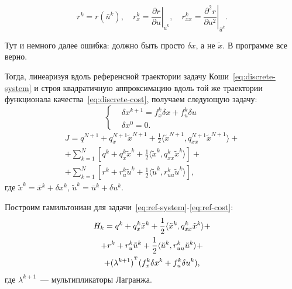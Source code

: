 $$
    r^k = r(\bar u^k),
    \quad
    r_x^k = \left.\frac{\partial r}{\partial u}\right|_{\bar u^k},
    \quad
    r_{xx}^k = \left.\frac{\partial^2 r}{\partial u^2}\right|_{\bar u^k}.
$$

{\color{red} Тут и немного далее ошибка: должно быть просто $\delta x$, а не $\tilde x$. В программе все верно.}

Тогда, линеаризуя вдоль референсной траектории задачу Коши~\eqref{eq:discrete-system} и строя квадратичную аппроксимацию вдоль той же траектории функционала качества~\eqref{eq:discrete-cost}, получаем следующую задачу:
\begin{equation}\label{eq:ref-system}
    \left\{\begin{aligned}
        &\delta x^{k+1} = f_x^k \delta x + f_u^k \delta u \\
        &\delta x^0 = 0.
    \end{aligned}\right.
\end{equation}
\begin{multline}\label{eq:ref-cost}
    J = q^{N+1} + q_x^{N+1}\tilde x^{N+1} + \frac{1}{2}\langle \tilde x^{N+1}, q_{xx}^{N+1}\tilde x^{N+1} \rangle
    + \\ +
    \sum_{k=1}^{N}\left[ q^{k} + q_x^{k}\tilde x^{k} + \frac{1}{2}\langle \tilde x^{k}, q_{xx}^{k}\tilde x^{k} \rangle \right]
    + \\ +
    \sum_{k=1}^{N}\left[ r^{k} + r_u^{k}\tilde u^{k} + \frac{1}{2}\langle \tilde u^{k}, r_{uu}^{k}\tilde u^{k} \rangle \right],
\end{multline}
где $\tilde x^k = \bar x^k + \delta x^k$, $\tilde u^k = \bar u^k + \delta u^k$.

Построим гамильтониан для задачи~\eqref{eq:ref-system}-\eqref{eq:ref-cost}:
\begin{multline}
    H_k = q^{k} + q_x^{k}\tilde x^{k} + \frac{1}{2}\langle \tilde x^{k}, q_{xx}^{k}\tilde x^{k} \rangle
    +\\+
    r^{k} + r_u^{k}\tilde u^{k} + \frac{1}{2}\langle \tilde u^{k}, r_{uu}^{k}\tilde u^{k} \rangle
    +\\+
    (\lambda^{k+1})^{^\mathrm{T}} (f_x^k \delta x^k + f_u^k \delta u^k),
\end{multline}
где $\lambda^{k+1}$~--- мультипликаторы Лагранжа.

